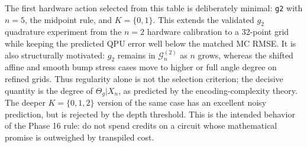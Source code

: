 \begin{table}[h]
\centering
{}
\caption{Representative Phase 16 shot-budget decision rows. The predicted QPU
error is the noisy-simulation total error from the Phase 15 audit when
available. MC RMSE uses the same total number of shots as the grouped MLAE
estimate.}
\label{tab:phase16-angle-scaling}
\end{table}

The first hardware action selected from this table is deliberately minimal:
\texttt{g2} with \(n=5\), the midpoint rule, and \(K=\{0,1\}\). This extends
the validated \(g_2\) quadrature experiment from the \(n=2\) hardware
calibration to a 32-point grid while keeping the predicted QPU error well below
the matched MC RMSE. It is also structurally motivated: \(g_2\) remains in
\(\mathcal{G}^{(2)}_n\) as \(n\) grows, whereas the shifted affine and smooth
bump stress cases move to higher or full angle degree on refined grids. Thus
regularity alone is not the selection criterion; the decisive quantity is the
degree of \(\Theta_g|X_n\), as predicted by the encoding-complexity theory.
The deeper \(K=\{0,1,2\}\) version of the same case has an
excellent noisy prediction, but is rejected by the depth threshold. This is the
intended behavior of the Phase 16 rule: do not spend credits on a circuit whose
mathematical promise is outweighed by transpiled cost.

